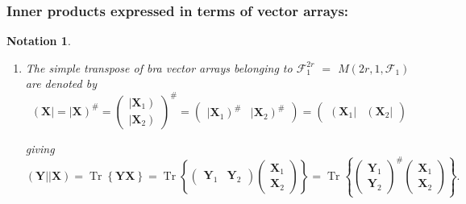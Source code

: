 \documentclass[aps, preprint]{revtex4}
\newtheorem{notation}[theorem]{Notation}
\begin{document}
\subsubsection{Inner products expressed in terms of vector arrays:}
\begin{notation}
\begin{enumerate}
\item The \emph{simple} \emph{transpose} of bra vector arrays belonging to $\mathcal{F}_{1}^{2 r}$ $ =$ $M \left (2 r ,1 ,\mathcal{F}_{1}\right )$ are denoted by
\begin{equation}\left (\mathbf{X}\right \vert  =\left \vert \mathbf{X}\right )^{\#} =\left (\begin{array}{c}\left \vert \mathbf{X}_{1}\right ) \\
\left \vert \mathbf{X}_{2}\right )\end{array}\right )^{\#} =\left (\begin{array}{cc}\left \vert \mathbf{X}_{1}\right )^{\#} & \left \vert \mathbf{X}_{2}\right )^{\#}\end{array}\right ) =\left (\begin{array}{cc}\left (\mathbf{X}_{1}\right \vert  & \left (\mathbf{X}_{2}\right \vert \end{array}\right )
\end{equation}

giving
\begin{equation}\left (\mathbf{Y}\right \vert \left \vert \mathbf{X}\right ) =\ensuremath{\operatorname*{Tr}} \left \{\mathbf{Y} \mathbf{X}\right \} =\ensuremath{\operatorname*{Tr}} \left \{\left (\begin{array}{cc}\boldsymbol{Y}_{1} & \mathbf{Y}_{2}\end{array}\right ) \left (\begin{array}{c}\mathbf{X}_{1} \\
\mathbf{X}_{2}\end{array}\right )\right \} =\ensuremath{\operatorname*{Tr}} \left \{\left (\begin{array}{c}\mathbf{Y}_{1} \\
\mathbf{Y}_{2}\end{array}\right )^{\#} \left (\begin{array}{c}\mathbf{X}_{1} \\
\mathbf{X}_{2}\end{array}\right )\right \}\text{.}
\end{equation}


\end{enumerate}
\end{notation}
\end{document}
